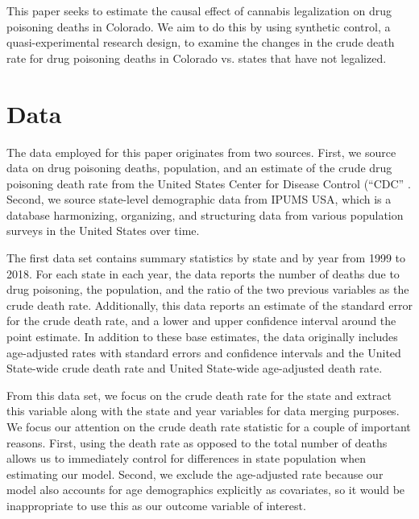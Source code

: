 \documentclass{article}
\begin{document}
This paper seeks to estimate the causal effect of cannabis legalization on drug poisoning deaths in Colorado. We aim to do this by using synthetic control, a quasi-experimental research design, to examine the changes in the crude death rate for drug poisoning deaths in Colorado vs. states that have not legalized. 

\section{Data}

The data employed for this paper originates from two sources. First, we source data on drug poisoning deaths, population, and an estimate of the crude drug poisoning death rate from the United States Center for Disease Control (``CDC'' \citep{cdc}. Second, we source state-level demographic data from IPUMS USA, which is a database harmonizing, organizing, and structuring data from various population surveys in the United States over time.\citep{ipums}

The first data set contains summary statistics by state and by year from 1999 to 2018. For each state in each year, the data reports the number of deaths due to drug poisoning, the population, and the ratio of the two previous variables as the crude death rate. Additionally, this data reports an estimate of the standard error for the crude death rate, and a lower and upper confidence interval around the point estimate. In addition to these base estimates, the data originally includes age-adjusted rates with standard errors and confidence intervals and the United State-wide crude death rate and United State-wide age-adjusted death rate. 

From this data set, we focus on the crude death rate for the state and extract this variable along with the state and year variables for data merging purposes. We focus our attention on the crude death rate statistic for a couple of important reasons. First, using the death rate as opposed to the total number of deaths allows us to immediately control for differences in state population when estimating our model. Second, we exclude the age-adjusted rate because our model also accounts for age demographics explicitly as covariates, so it would be inappropriate to use this as our outcome variable of interest.
\end{document}
